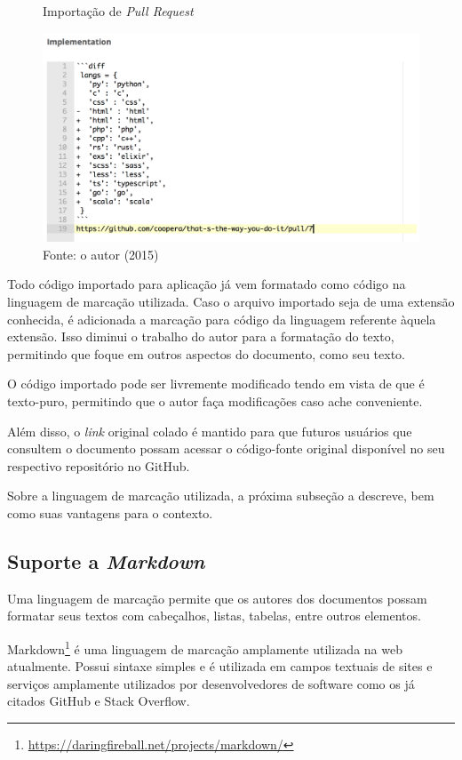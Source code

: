 \begin{figure}[h]
	\centering
    \caption{Importação de \textit{Pull Request}}
    \includegraphics[width=15cm]{Imagens/import-pr.png}
	\caption*{Fonte: o autor (2015)}
\end{figure}

Todo código importado para aplicação já vem formatado como código na linguagem de marcação utilizada. Caso o arquivo importado seja de uma extensão conhecida, é adicionada a marcação para código da linguagem referente àquela extensão. Isso diminui o trabalho do autor para a formatação do texto, permitindo que foque em outros aspectos do documento, como seu texto.

O código importado pode ser livremente modificado tendo em vista de que é texto-puro, permitindo que o autor faça modificações caso ache conveniente.

Além disso, o \textit{link} original colado é mantido para que futuros usuários que consultem o documento possam acessar o código-fonte original disponível no seu respectivo repositório no GitHub.

Sobre a linguagem de marcação utilizada, a próxima subseção a descreve, bem como suas vantagens para o contexto.

\subsection{Suporte a \textit{Markdown}}

Uma linguagem de marcação permite que os autores dos documentos possam formatar seus textos com cabeçalhos, listas, tabelas, entre outros elementos.

Markdown\footnote{\url{https://daringfireball.net/projects/markdown/}} é uma linguagem de marcação amplamente utilizada na web atualmente. Possui sintaxe simples e é utilizada em campos textuais de sites e serviços amplamente utilizados por desenvolvedores de software como os já citados GitHub e Stack Overflow.

